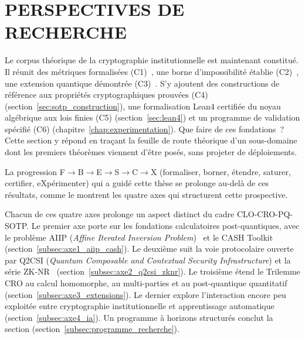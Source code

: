 
\section{PERSPECTIVES DE RECHERCHE}
\label{sec:perspectives}
\begin{sloppypar}
Le corpus th\'eorique de la cryptographie institutionnelle est maintenant
constitu\'e. Il r\'eunit des m\'etriques formalis\'ees (C1)~\cite{MINKA2026CLO}, une borne
d'impossibilit\'e \'etablie (C2)~\cite{MINKA2026CRO}, une extension quantique
d\'emontr\'ee (C3)~\cite{MINKA2026PQCRO}. S'y ajoutent des constructions de r\'ef\'erence aux propri\'et\'es
cryptographiques prouv\'ees (C4) (section~\ref{sec:sotp_construction}), une formalisation Lean4 certifi\'ee du noyau alg\'ebrique aux lois finies (C5)
(section~\ref{sec:lean4}) et un programme de validation sp\'ecifi\'e (C6)
(chapitre~\ref{chap:experimentation}). Que faire de ces fondations~?
Cette section y r\'epond en
tra\c{c}ant la feuille de route th\'eorique d'un sous-domaine dont les
premiers th\'eor\`emes viennent d'\^etre pos\'es, sans projeter de d\'eploiements.

La progression F$\to$B$\to$E$\to$S$\to$C$\to$X
(formaliser, borner, \'etendre, saturer, certifier, eXp\'erimenter)
qui a guid\'e cette th\`ese se prolonge au-del\`a de ces r\'esultats, comme le montrent les quatre axes qui structurent cette
prospective.

Chacun de ces quatre axes prolonge un aspect
distinct du cadre CLO-CRO-PQ-SOTP. Le premier axe porte sur les fondations calculatoires
post-quantiques, avec le probl\`eme AIIP (\textit{Affine Iterated Inversion Problem})~\cite{MINKA2025AIIP} et le
CASH Toolkit (section~\ref{subsec:axe1_aiip_cash}). Le deuxi\`eme suit la voie protocolaire
ouverte par Q2CSI (\textit{Quantum Composable and Contextual Security Infrastructure}) et la s\'erie
ZK-NR~\cite{MINKA2025Q2CSI,MINKA2025ZKNR_Exploration,MINKA2025ZKNR_Design,MINKA2025ZKNR_UC}
(section~\ref{subsec:axe2_q2csi_zknr}). Le troisi\`eme \'etend le
Trilemme CRO au calcul homomorphe, au multi-parties et au
post-quantique quantitatif (section~\ref{subsec:axe3_extensions}). Le dernier explore
l'interaction encore peu exploit\'ee entre cryptographie
institutionnelle et apprentissage automatique (section~\ref{subsec:axe4_ia}).
Un programme \`a horizons structur\'es conclut la section
(section~\ref{subsec:programme_recherche}).
\end{sloppypar}

